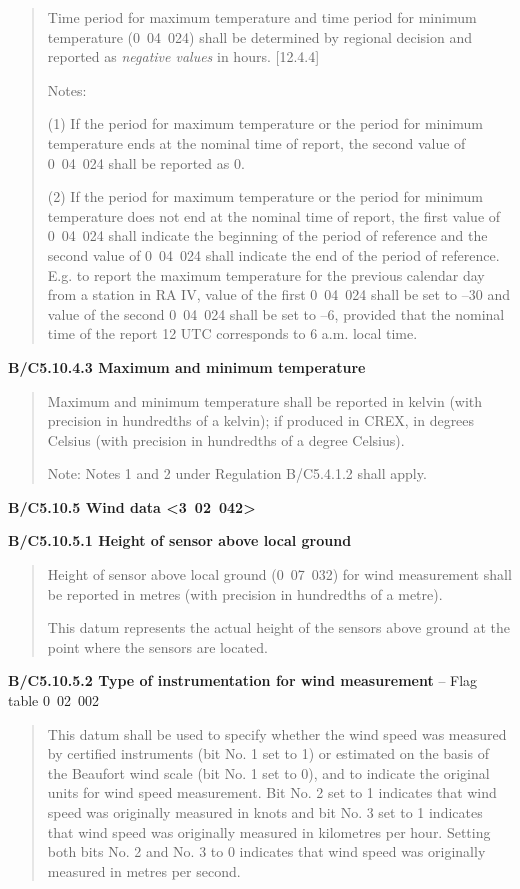 \begin{quote}
Time period for maximum temperature and time period for minimum temperature (0~04~024) shall be determined by regional decision and reported as \emph{negative values} in hours. {[}12.4.4{]}

Notes:

(1) If the period for maximum temperature or the period for minimum temperature ends at the nominal time of report, the second value of 0~04~024 shall be reported as 0.

(2) If the period for maximum temperature or the period for minimum temperature does not end at the nominal time of report, the first value of 0~04~024 shall indicate the beginning of the period of reference and the second value of 0~04~024 shall indicate the end of the period of reference. E.g. to report the maximum temperature for the previous calendar day from a station in RA IV, value of the first 0~04~024 shall be set to --30 and value of the second 0~04~024 shall be set to --6, provided that the nominal time of the report 12 UTC corresponds to 6 a.m. local time.
\end{quote}

\textbf{B/C5.10.4.3 Maximum and minimum temperature}

\begin{quote}
Maximum and minimum temperature shall be reported in kelvin (with precision in hundredths of a kelvin); if produced in CREX, in degrees Celsius (with precision in hundredths of a degree Celsius).

Note: Notes 1 and 2 under Regulation B/C5.4.1.2 shall apply.
\end{quote}

\textbf{B/C5.10.5 Wind data \textless3~02~042\textgreater{}}

\textbf{B/C5.10.5.1 Height of sensor above local ground}

\begin{quote}
Height of sensor above local ground (0~07~032) for wind measurement shall be reported in metres (with precision in hundredths of a metre).

This datum represents the actual height of the sensors above ground at the point where the sensors are located.
\end{quote}

\textbf{B/C5.10.5.2 Type of instrumentation for wind measurement} -- Flag table 0~02~002

\begin{quote}
This datum shall be used to specify whether the wind speed was measured by certified instruments (bit No. 1 set to 1) or estimated on the basis of the Beaufort wind scale (bit No. 1 set to 0), and to indicate the original units for wind speed measurement. Bit No. 2 set to 1 indicates that wind speed was originally measured in knots and bit No. 3 set to 1 indicates that wind speed was originally measured in kilometres per hour. Setting both bits No. 2 and No. 3 to 0 indicates that wind speed was originally measured in metres per second.
\end{quote}


